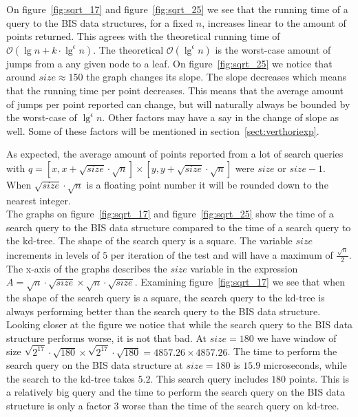 On figure~\ref{fig:sqrt_17} and figure~\ref{fig:sqrt_25} we see that the running time of a query to the BIS data structures, for a fixed $n$, increases linear to the amount of points returned. This agrees with the theoretical running time of $\mathcal{O}(\lg n + k\cdot \lg^\epsilon n)$. The theoretical $\mathcal{O}(\lg^\epsilon n)$ is the worst-case amount of jumps from a any given node to a leaf. On figure~\ref{fig:sqrt_25} we notice that around $size\approx 150$ the graph changes its slope. The slope decreases which means that the running time per point decreases. This means that the average amount of jumps per point reported can change, but will naturally always be bounded by the worst-case of $\lg^\epsilon n$. Other factors may have a say in the change of slope as well. Some of these factors will be mentioned in section~\ref{sect:verthoriexp}.

\noindent As expected, the average amount of points reported from a lot of search queries with $q = [x, x + \sqrt{size}\cdot\sqrt{n}] \times [y, y + \sqrt{size}\cdot\sqrt{n}]$ were $size$ or $size-1$. When $\sqrt{size}\cdot\sqrt{n}$ is a floating point number it will be rounded down to the nearest integer. \\

The graphs on figure~\ref{fig:sqrt_17} and figure~\ref{fig:sqrt_25} show the time of a search query to the BIS data structure compared to the time of a search query to the kd-tree. The shape of the search query is a square. The variable $size$ increments in levels of $5$ per iteration of the test and will have a maximum of $\frac{\sqrt{n}}{2}$. The x-axis of the graphs describes the $size$ variable in the expression $A = \sqrt{n}\cdot\sqrt{size} \times \sqrt{n}\cdot\sqrt{size}$. Examining figure~\ref{fig:sqrt_17} we see that when the shape of the search query is a square, the search query to the kd-tree is always performing better than the search query to the BIS data structure. Looking closer at the figure we notice that while the search query to the BIS data structure performs worse, it is not that bad. At $size = 180$ we have window of size $\sqrt{2^{17}}\cdot\sqrt{180} \times \sqrt{2^{17}}\cdot\sqrt{180} = 4857.26 \times 4857.26$. The time to perform the search query on the BIS data structure at $size = 180$ is $15.9$ microseconds, while the search to the kd-tree takes $5.2$. This search query includes $180$ points. This is a relatively big query and the time to perform the search query on the BIS data structure is only a factor $3$ worse than the time of the search query on kd-tree.


